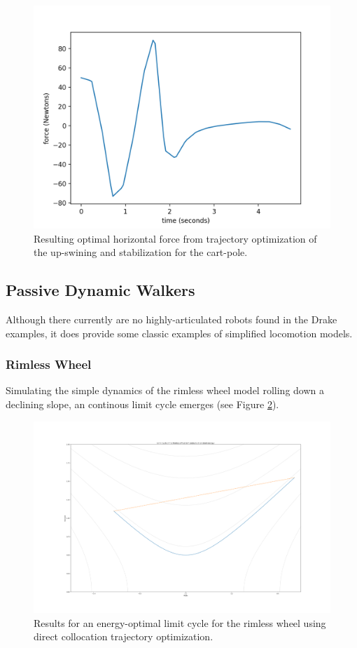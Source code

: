 \begin{figure}[h!]
\centering
\includegraphics[width=.7\linewidth]{Media/Drake/ExSimple/CartPoleTrajOptDirCol_Solution.png}
\caption{Resulting optimal horizontal force from trajectory optimization of the up-swining and stabilization for the cart-pole.}
\label{fig:cart-pole}
\end{figure}

\subsection{Passive Dynamic Walkers}
Although there currently are no highly-articulated robots found in the Drake examples, it does provide some classic examples of simplified locomotion models. 

\subsubsection{Rimless Wheel}
Simulating the simple dynamics of the rimless wheel model rolling down a declining slope, an continous limit cycle emerges (see Figure \ref{fig:rimlessWheel}).
\begin{figure}[h!]
\centering
\includegraphics[width=1\linewidth]{Media/Drake/ExSimpleWalking/RimlessWheelDirCol_LimitCycle.png}
\caption{Results for an energy-optimal limit cycle for the rimless wheel using direct collocation trajectory optimization.}
\label{fig:rimlessWheel}
\end{figure}

